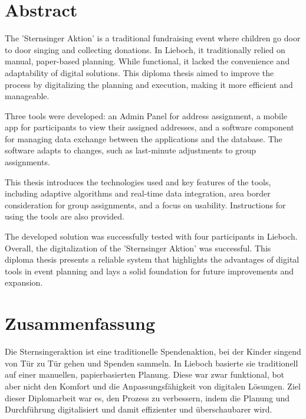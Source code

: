 
\noindent
\setlength{\parindent}{0pt}
\begin{spacing}{1.5}


\section*{Abstract}
The 'Sternsinger Aktion' is a traditional fundraising event where children go door to door singing and collecting donations. In Lieboch, it traditionally relied on manual, paper-based planning. While functional, it lacked the convenience and adaptability of digital solutions. This diploma thesis aimed to improve the process by digitalizing the planning and execution, making it more efficient and manageable.\blankLine


Three tools were developed: an Admin Panel for address assignment, a mobile app for participants to view their assigned addresses, and a software component for managing data exchange between the applications and the database. The software adapts to changes, such as last-minute adjustments to group assignments.\blankLine


This thesis introduces the technologies used and key features of the tools, including adaptive algorithms and real-time data integration, area border consideration for group assignments, and a focus on usability. Instructions for using the tools are also provided.\blankLine


The developed solution was successfully tested with four participants in Lieboch. Overall, the digitalization of the 'Sternsinger Aktion' was successful. This diploma thesis presents a reliable system that highlights the advantages of digital tools in event planning and lays a solid foundation for future improvements and expansion.\blankLine


\newpage

\section*{Zusammenfassung}
Die Sternsingeraktion ist eine traditionelle Spendenaktion, bei der Kinder singend von Tür zu Tür gehen und Spenden sammeln. In Lieboch basierte sie traditionell auf einer manuellen, papierbasierten Planung. Diese war zwar funktional, bot aber nicht den Komfort und die Anpassungsfähigkeit von digitalen Lösungen. Ziel dieser Diplomarbeit war es, den Prozess zu verbessern, indem die Planung und Durchführung digitalisiert und damit effizienter und überschaubarer wird.\blankLine


\end{spacing}
